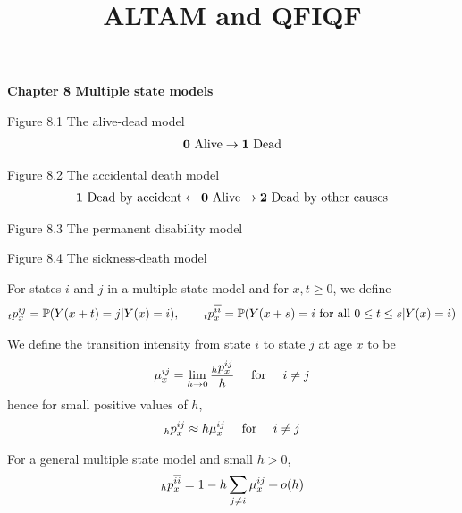 \documentclass[hidelinks, 12pt]{article}
\title{ALTAM and QFIQF}
\date{}
\theoremstyle{mydefstyle}
\theoremstyle{mythmstyle}
\begin{document}
\pagecolor{white}

\begin{center}
\textbf{Chapter 8 Multiple state models}
\end{center}

Figure 8.1 The alive-dead model
\begin{gather*}
\mbox{\textbf{0} Alive} \to \mbox{\textbf{1} Dead}
\end{gather*}

Figure 8.2 The accidental death model
\begin{gather*}
\mbox{\textbf{1} Dead by accident} \leftarrow \mbox{\textbf{0} Alive} \to \mbox{\textbf{2} Dead by other causes}
\end{gather*}

Figure 8.3 The permanent disability model

Figure 8.4 The sickness-death model

For states $i$ and $j$ in a multiple state model and for $x, t \ge 0$, we define
\begin{gather*}
\hspace{0mm}_tp_x^{ij} = \mathbb{P}(Y(x+t) = j \vert Y(x) = i), \qquad
\hspace{0mm}_tp_x^{\overline{ii}} = \mathbb{P}(Y(x+s) = i \mbox{ for all } 0 \le t \le s \vert Y(x) = i)
\end{gather*}

We define the transition intensity from state $i$ to state $j$ at age $x$ to be
\begin{gather*}
\mu_x^{ij} = \lim_{h \to 0} \frac{\hspace{0mm}_hp_x^{ij}}{h} \quad\mbox{ for }\quad i \ne j
\end{gather*}
hence for small positive values of $h$,
\begin{gather*}
\hspace{0mm}_hp_x^{ij} \approx h \mu_x^{ij} \quad\mbox{ for }\quad i \ne j
\end{gather*}

For a general multiple state model and small $h > 0$,
\begin{gather*}
\hspace{0mm}_hp_x^{\overline{ii}} = 1 - h \sum_{j \ne i} \mu_x^{ij} + o(h)
\end{gather*}

\newpage
\end{document}
